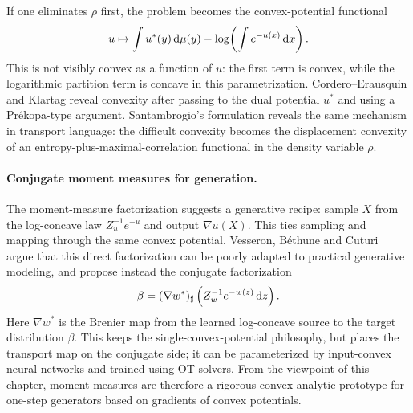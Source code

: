 \begin{rem}\label{rem-moment-hidden-convexity}
	If one eliminates $\rho$ first, the problem becomes the convex-potential functional
	\[
		u\mapsto
		\int u^*(y)\,\mathrm{d}\mu(y)
		-
		\log\!\left(\int e^{-u(x)}\,\mathrm{d} x\right).
	\]
	This is not visibly convex as a function of $u$: the first term is convex, while the logarithmic partition term is concave in this parametrization. Cordero--Erausquin and Klartag reveal convexity after passing to the dual potential $u^*$ and using a Pr\'ekopa-type argument. Santambrogio's formulation reveals the same mechanism in transport language: the difficult convexity becomes the displacement convexity of an entropy-plus-maximal-correlation functional in the density variable $\rho$.
\end{rem}

\paragraph{Conjugate moment measures for generation.}
The moment-measure factorization suggests a generative recipe: sample $X$ from the log-concave law $Z_u^{-1}e^{-u}$ and output $\nabla u(X)$. This ties sampling and mapping through the same convex potential. Vesseron, B\'ethune and Cuturi~\cite{VesseronBethuneCuturi2025ConjugateMomentMeasures} argue that this direct factorization can be poorly adapted to practical generative modeling, and propose instead the conjugate factorization
\begin{equation}\label{eq-conjugate-moment-measure}
	\beta
	=
	(\nabla w^*)_\sharp
	\left(Z_w^{-1}e^{-w(z)}\,\mathrm{d} z\right).
\end{equation}
Here $\nabla w^*$ is the Brenier map from the learned log-concave source to the target distribution $\beta$. This keeps the single-convex-potential philosophy, but places the transport map on the conjugate side; it can be parameterized by input-convex neural networks and trained using OT solvers. From the viewpoint of this chapter, moment measures are therefore a rigorous convex-analytic prototype for one-step generators based on gradients of convex potentials.

